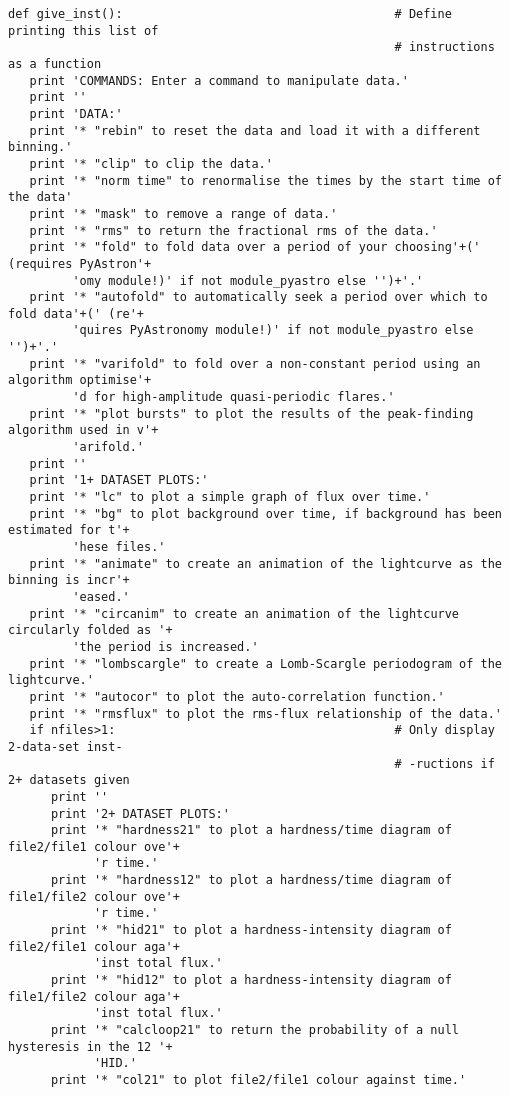 \begin{verbatim}
def give_inst():                                      # Define printing this list of
                                                      # instructions as a function
   print 'COMMANDS: Enter a command to manipulate data.'
   print ''
   print 'DATA:'
   print '* "rebin" to reset the data and load it with a different binning.'
   print '* "clip" to clip the data.'
   print '* "norm time" to renormalise the times by the start time of the data'
   print '* "mask" to remove a range of data.'
   print '* "rms" to return the fractional rms of the data.'
   print '* "fold" to fold data over a period of your choosing'+(' (requires PyAstron'+
         'omy module!)' if not module_pyastro else '')+'.'
   print '* "autofold" to automatically seek a period over which to fold data'+(' (re'+
         'quires PyAstronomy module!)' if not module_pyastro else '')+'.'
   print '* "varifold" to fold over a non-constant period using an algorithm optimise'+
         'd for high-amplitude quasi-periodic flares.'
   print '* "plot bursts" to plot the results of the peak-finding algorithm used in v'+
         'arifold.'
   print ''
   print '1+ DATASET PLOTS:'
   print '* "lc" to plot a simple graph of flux over time.'
   print '* "bg" to plot background over time, if background has been estimated for t'+
         'hese files.'
   print '* "animate" to create an animation of the lightcurve as the binning is incr'+
         'eased.'
   print '* "circanim" to create an animation of the lightcurve circularly folded as '+
         'the period is increased.'
   print '* "lombscargle" to create a Lomb-Scargle periodogram of the lightcurve.'
   print '* "autocor" to plot the auto-correlation function.'
   print '* "rmsflux" to plot the rms-flux relationship of the data.'
   if nfiles>1:                                       # Only display 2-data-set inst-
                                                      # -ructions if 2+ datasets given
      print ''
      print '2+ DATASET PLOTS:'
      print '* "hardness21" to plot a hardness/time diagram of file2/file1 colour ove'+
            'r time.'
      print '* "hardness12" to plot a hardness/time diagram of file1/file2 colour ove'+
            'r time.'
      print '* "hid21" to plot a hardness-intensity diagram of file2/file1 colour aga'+
            'inst total flux.'
      print '* "hid12" to plot a hardness-intensity diagram of file1/file2 colour aga'+
            'inst total flux.'
      print '* "calcloop21" to return the probability of a null hysteresis in the 12 '+
            'HID.'
      print '* "col21" to plot file2/file1 colour against time.'

\end{verbatim}
